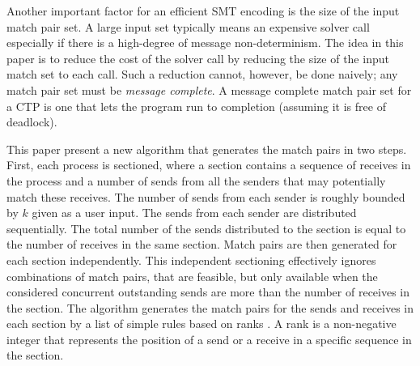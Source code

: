 Another important factor for an efficient SMT encoding is the size of the input match pair set. A large input set typically means an expensive solver call especially if there is a high-degree of message non-determinism. 
The idea in this paper is to reduce the cost of the solver call by reducing the size of the input match set to each call. Such a reduction cannot, however, be done naively; any match pair set must be \emph{message complete}.  A message complete match pair set for a CTP is one that lets the program run to completion (assuming it is free of deadlock). 

This paper present a new algorithm that generates the match pairs in two steps. 
First, each process is sectioned, where a section contains a sequence of receives in the process and a number of sends from all the senders that may potentially match these receives. The number of sends from each sender is roughly bounded by  $k$ given as a user input. 
The sends from each sender are distributed sequentially. 
The total number of the sends distributed to the section is equal to the number of receives in the same section. 
Match pairs are then generated for each section independently. This independent sectioning effectively ignores combinations of match pairs, that are feasible, but only available when the considered concurrent outstanding sends are more than the number of receives in the section. 
The algorithm generates the match pairs for the sends and receives in each section by a list of simple rules based on ranks \cite{DBLP:conf/kbse/HuangMM13}. A rank is a non-negative integer that represents the position of a send or a receive in a specific sequence in the section.


